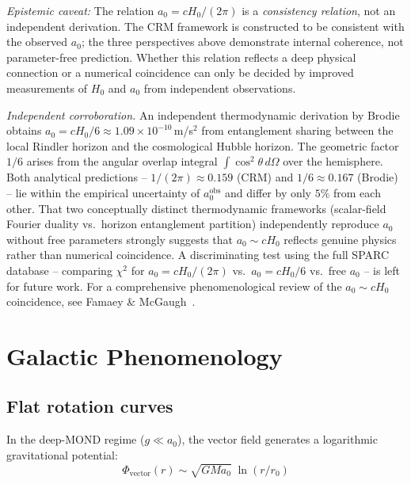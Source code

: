 \documentclass[aps,prd,twocolumn,superscriptaddress,nofootinbib]{revtex4-2}
\begin{document}
\textit{Epistemic caveat:} The relation $a_0 = cH_0/(2\pi)$ is a \emph{consistency relation}, not an independent derivation. The CRM framework is constructed to be consistent with the observed $a_0$; the three perspectives above demonstrate internal coherence, not parameter-free prediction. Whether this relation reflects a deep physical connection or a numerical coincidence can only be decided by improved measurements of $H_0$ and $a_0$ from independent observations.

\textit{Independent corroboration.} An independent thermodynamic derivation by Brodie~\cite{Brodie2026} obtains $a_0 = cH_0/6 \approx 1.09 \times 10^{-10}$\,m/s$^2$ from entanglement sharing between the local Rindler horizon and the cosmological Hubble horizon. The geometric factor $1/6$ arises from the angular overlap integral $\int \cos^2\theta\,d\Omega$ over the hemisphere. Both analytical predictions -- $1/(2\pi) \approx 0.159$ (CRM) and $1/6 \approx 0.167$ (Brodie) -- lie within the empirical uncertainty of $a_0^{\mathrm{obs}}$ and differ by only $5\%$ from each other. That two conceptually distinct thermodynamic frameworks (scalar-field Fourier duality vs.\ horizon entanglement partition) independently reproduce $a_0$ without free parameters strongly suggests that $a_0 \sim cH_0$ reflects genuine physics rather than numerical coincidence. A discriminating test using the full SPARC database -- comparing $\chi^2$ for $a_0 = cH_0/(2\pi)$ vs.\ $a_0 = cH_0/6$ vs.\ free $a_0$ -- is left for future work. For a comprehensive phenomenological review of the $a_0 \sim cH_0$ coincidence, see Famaey \& McGaugh~\cite{FamaeyMcGaugh2012}.


\section{Galactic Phenomenology}
\label{sec:phenomenology}

\subsection{Flat rotation curves}
\label{sec:rotation_curves}

In the deep-MOND regime ($g \ll a_0$), the vector field generates a logarithmic gravitational potential:
\begin{equation}
\Phi_{\mathrm{vector}}(r) \sim \sqrt{G M a_0}\;\ln(r/r_0)
\label{eq:log_potential}
\end{equation}
\end{document}
